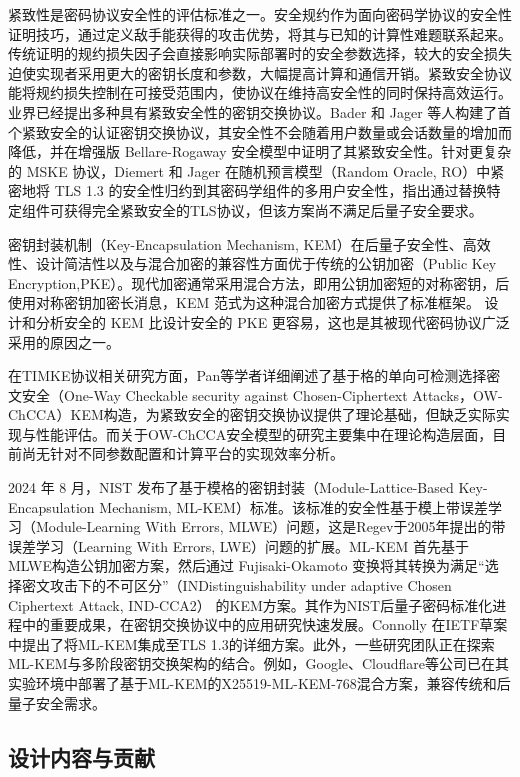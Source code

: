 紧致性是密码协议安全性的评估标准之一。安全规约作为面向密码学协议的安全性证明技巧，通过定义敌手能获得的攻击优势，将其与已知的计算性难题联系起来。传统证明的规约损失因子会直接影响实际部署时的安全参数选择，较大的安全损失迫使实现者采用更大的密钥长度和参数，大幅提高计算和通信开销。紧致安全协议能将规约损失控制在可接受范围内，使协议在维持高安全性的同时保持高效运行。业界已经提出多种具有紧致安全性的密钥交换协议。Bader 和 Jager 等人\cite{bader_tightly-secure_2014}构建了首个紧致安全的认证密钥交换协议，其安全性不会随着用户数量或会话数量的增加而降低，并在增强版 Bellare-Rogaway 安全模型中证明了其紧致安全性。针对更复杂的 MSKE 协议，Diemert 和 Jager \cite{davis_concrete_2022}在随机预言模型（Random Oracle, RO）中紧密地将 TLS 1.3 的安全性归约到其密码学组件的多用户安全性，指出通过替换特定组件可获得完全紧致安全的TLS协议，但该方案尚不满足后量子安全要求。

密钥封装机制（Key-Encapsulation Mechanism, KEM）在后量子安全性、高效性、设计简洁性以及与混合加密的兼容性方面优于传统的公钥加密（Public Key Encryption,PKE）。现代加密通常采用混合方法，即用公钥加密短的对称密钥，后使用对称密钥加密长消息，KEM 范式为这种混合加密方式提供了标准框架。 设计和分析安全的 KEM 比设计安全的 PKE 更容易，这也是其被现代密码协议广泛采用的原因之一。

在TIMKE协议相关研究方面，Pan等学者\cite{pan_lattice-based_2023}详细阐述了基于格的单向可检测选择密文安全（One-Way Checkable security against Chosen-Ciphertext Attacks，OW-ChCCA）KEM构造，为紧致安全的密钥交换协议提供了理论基础，但缺乏实际实现与性能评估。而关于OW-ChCCA安全模型的研究主要集中在理论构造层面，目前尚无针对不同参数配置和计算平台的实现效率分析。

2024 年 8 月，NIST 发布了基于模格的密钥封装（Module-Lattice-Based Key-Encapsulation Mechanism, ML-KEM）标准\cite{nist_mlkem_2024}。该标准的安全性基于模上带误差学习（Module-Learning With Errors, MLWE）问题，这是Regev于2005年提出的带误差学习（Learning With Errors, LWE）问题的扩展。ML-KEM 首先基于MLWE构造公钥加密方案，然后通过 Fujisaki-Okamoto 变换将其转换为满足“选择密文攻击下的不可区分”（INDistinguishability under adaptive Chosen Ciphertext Attack, IND-CCA2） 的KEM方案。其作为NIST后量子密码标准化进程中的重要成果，在密钥交换协议中的应用研究快速发展。Connolly 在IETF草案\cite{connolly_ml-kem_2024}中提出了将ML-KEM集成至TLS 1.3的详细方案。此外，一些研究团队正在探索ML-KEM与多阶段密钥交换架构的结合。例如，Google、Cloudflare等公司已在其实验环境中部署了基于ML-KEM的X25519-ML-KEM-768混合方案\cite{noauthor_pqc_2025}，兼容传统和后量子安全需求。

\subsection{设计内容与贡献}


